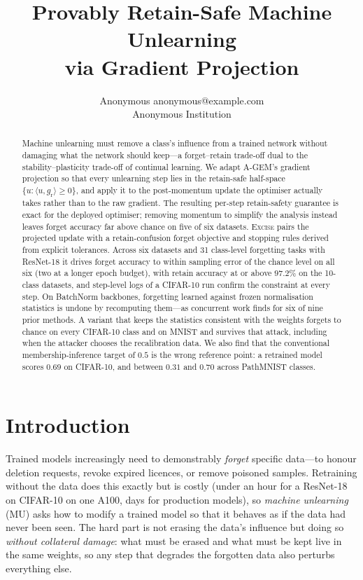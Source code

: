 \documentclass{article}
\title{Provably Retain-Safe Machine Unlearning\\ via Gradient Projection}
\author{\name Anonymous \email anonymous@example.com \\
        \addr Anonymous Institution}
\newcommand{\ours}{\textsc{Excise}}
\newcommand{\gr}{g_{\mathrm{r}}}
\newcommand{\rev}[1]{{\color{revisedB}#1}}
\theoremstyle{remark}
\theoremstyle{plain}
\begin{document}
\maketitle
\suppressfloats[t]%

\begin{abstract}
Machine unlearning must remove a class's influence from a trained network
without damaging what the network should keep---a forget--retain trade-off dual
to the stability--plasticity trade-off of continual learning. We adapt A-GEM's
gradient projection so that every unlearning step lies in the retain-safe
half-space $\{u : \langle u,\gr\rangle \ge 0\}$, and apply it to the
post-momentum update the optimiser actually takes rather than to the raw
gradient. The resulting per-step retain-safety guarantee is exact for the
deployed optimiser; removing momentum to simplify the analysis instead
\rev{leaves forget accuracy far above chance on five of six datasets}. \ours{}
pairs the projected update with a
retain-confusion forget objective and stopping rules derived from explicit
tolerances. Across six datasets and 31 class-level forgetting tasks with
ResNet-18 it drives forget accuracy to \rev{within sampling error of} the chance
level on all six (two at a longer epoch budget), with retain accuracy at or above
$97.2\%$ on the 10-class datasets, and step-level logs \rev{of a CIFAR-10 run}
confirm the constraint at every step. \rev{On BatchNorm backbones, forgetting
learned against frozen normalisation statistics is undone by recomputing
them---as concurrent work finds for six of nine prior methods. A variant that
keeps the statistics consistent with the weights forgets to chance on every
CIFAR-10 class and on MNIST and survives that attack, including when the
attacker chooses the recalibration data.} We also find that the conventional
membership-inference
target of $0.5$ is the wrong reference point: a retrained model scores $0.69$ on
CIFAR-10, and between $0.31$ and $0.70$ across PathMNIST classes.
\end{abstract}

\section{Introduction}\label{sec:intro}

Trained models increasingly need to demonstrably \emph{forget} specific
data---to honour deletion requests, revoke expired licences, or remove poisoned
samples. Retraining without the data does this exactly but is costly
(\rev{under an hour} for a ResNet-18 on CIFAR-10 on one A100, days for production
models), so \emph{machine unlearning} (MU) asks how to modify a trained model so
that it behaves as if the data had never been seen. The hard part is not erasing
the data's influence but doing so \emph{without collateral damage}: what must be
erased and what must be kept live in the same weights, so any step that degrades
the forgotten data also perturbs everything else.
\end{document}
